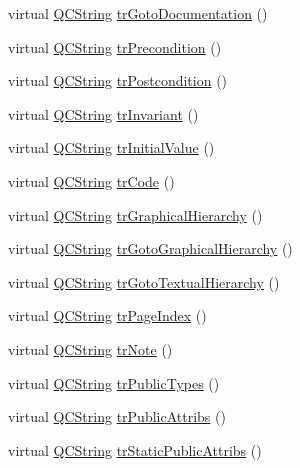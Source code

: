 \begin{DoxyCompactItemize}
virtual \hyperlink{class_q_c_string}{Q\+C\+String} \hyperlink{class_translator_arabic_a80b353827c8c85f04426634456b44c65}{tr\+Goto\+Documentation} ()
\item 
virtual \hyperlink{class_q_c_string}{Q\+C\+String} \hyperlink{class_translator_arabic_a7ec599787534ebd84dda9bb8ed77d805}{tr\+Precondition} ()
\item 
virtual \hyperlink{class_q_c_string}{Q\+C\+String} \hyperlink{class_translator_arabic_a409bdca2f430c6ef7addadf3e11ad8b4}{tr\+Postcondition} ()
\item 
virtual \hyperlink{class_q_c_string}{Q\+C\+String} \hyperlink{class_translator_arabic_ade17d8c502815f2621b59e7ceee94ad7}{tr\+Invariant} ()
\item 
virtual \hyperlink{class_q_c_string}{Q\+C\+String} \hyperlink{class_translator_arabic_a53954a512040eb590ba15eead23028c3}{tr\+Initial\+Value} ()
\item 
virtual \hyperlink{class_q_c_string}{Q\+C\+String} \hyperlink{class_translator_arabic_a87c4d89643371e232eda030de5b28471}{tr\+Code} ()
\item 
virtual \hyperlink{class_q_c_string}{Q\+C\+String} \hyperlink{class_translator_arabic_a125c7a753cd7cf2c6fd441100f0b27f8}{tr\+Graphical\+Hierarchy} ()
\item 
virtual \hyperlink{class_q_c_string}{Q\+C\+String} \hyperlink{class_translator_arabic_a113217f23b166c04cc88bd5c542c3115}{tr\+Goto\+Graphical\+Hierarchy} ()
\item 
virtual \hyperlink{class_q_c_string}{Q\+C\+String} \hyperlink{class_translator_arabic_a788998328363d095587dd936ad08c797}{tr\+Goto\+Textual\+Hierarchy} ()
\item 
virtual \hyperlink{class_q_c_string}{Q\+C\+String} \hyperlink{class_translator_arabic_a8a422c7dfab161d706b556f796282391}{tr\+Page\+Index} ()
\item 
virtual \hyperlink{class_q_c_string}{Q\+C\+String} \hyperlink{class_translator_arabic_a6645428a79954a4d9013e4b41790f282}{tr\+Note} ()
\item 
virtual \hyperlink{class_q_c_string}{Q\+C\+String} \hyperlink{class_translator_arabic_a30be8c0922eeac8dba02d08bf516f3d2}{tr\+Public\+Types} ()
\item 
virtual \hyperlink{class_q_c_string}{Q\+C\+String} \hyperlink{class_translator_arabic_a5b7b9cc8b73cc8c14490576587032694}{tr\+Public\+Attribs} ()
\item 
virtual \hyperlink{class_q_c_string}{Q\+C\+String} \hyperlink{class_translator_arabic_a09a2da1a556dfb3eabe44195cb23ef02}{tr\+Static\+Public\+Attribs} ()

\end{DoxyCompactItemize}
